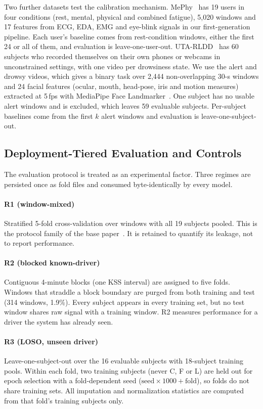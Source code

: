 \documentclass[journal]{IEEEtran}
\newcommand{\rone}{R1}
\newcommand{\rtwo}{R2}
\newcommand{\rthree}{R3}
\begin{document}
Two further datasets test the calibration mechanism. MePhy~\cite{zendehbad2025fatiguenet}
has 19 users in four conditions (rest, mental, physical and combined
fatigue), 5{,}020 windows and 17 features from ECG, EDA, EMG and eye-blink
signals in our first-generation pipeline. Each user's baseline comes from
rest-condition windows, either the first 24 or all of them, and evaluation is
leave-one-user-out. UTA-RLDD~\cite{ghoddoosian2019uta} has 60 subjects who
recorded themselves on their own phones or webcams in unconstrained settings,
with one video per drowsiness state. We use the alert and drowsy videos, which
gives a binary task over 2{,}444 non-overlapping 30-s windows and 24 facial
features (ocular, mouth, head-pose, iris and motion measures) extracted at
5\,fps with MediaPipe Face Landmarker~\cite{lugaresi2019mediapipe}. One
subject has no usable alert windows and is excluded, which leaves 59
evaluable subjects. Per-subject baselines come from the first $k$ alert
windows and evaluation is leave-one-subject-out.

\subsection{Deployment-Tiered Evaluation and Controls}
\label{sec:regimes}
The evaluation protocol is treated as an experimental factor. Three regimes
are persisted once as fold files and consumed byte-identically by every model.

\paragraph{\rone{} (window-mixed)} Stratified 5-fold cross-validation over
windows with all 19 subjects pooled. This is the protocol family of the base
paper~\cite{bodaghi2026uldd}. It is retained to quantify its leakage, not to
report performance.

\paragraph{\rtwo{} (blocked known-driver)} Contiguous 4-minute blocks (one KSS
interval) are assigned to five folds. Windows that straddle a block boundary
are purged from both training and test (314 windows, 1.9\%). Every subject
appears in every training set, but no test window shares raw signal with a
training window. \rtwo{} measures performance for a driver the system has
already seen.

\paragraph{\rthree{} (LOSO, unseen driver)} Leave-one-subject-out over the 16
evaluable subjects with 18-subject training pools. Within each fold, two
training subjects (never C, F or L) are held out for epoch selection with a
fold-dependent seed ($\text{seed}\times1000+\text{fold}$), so folds do not
share training sets. All imputation and normalization statistics are computed
from that fold's training subjects only.
\end{document}
